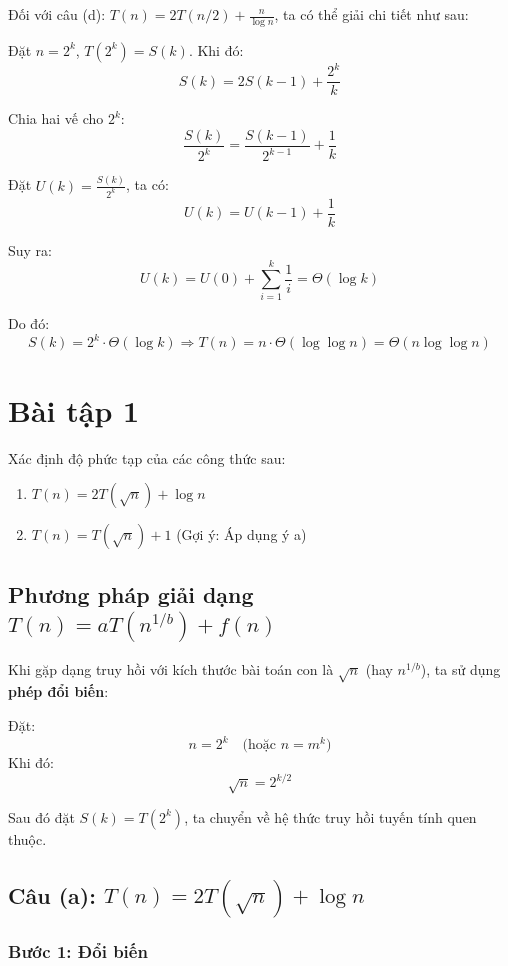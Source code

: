 \documentclass{article}
\begin{document}
Đối với câu (d): \(T(n) = 2T(n/2) + \frac{n}{\log n}\), ta có thể giải chi tiết như sau:

Đặt \(n = 2^k\), \(T(2^k) = S(k)\). Khi đó:
\[
S(k) = 2S(k-1) + \frac{2^k}{k}
\]

Chia hai vế cho \(2^k\):
\[
\frac{S(k)}{2^k} = \frac{S(k-1)}{2^{k-1}} + \frac{1}{k}
\]

Đặt \(U(k) = \frac{S(k)}{2^k}\), ta có:
\[
U(k) = U(k-1) + \frac{1}{k}
\]

Suy ra:
\[
U(k) = U(0) + \sum_{i=1}^k \frac{1}{i} = \Theta(\log k)
\]

Do đó:
\[
S(k) = 2^k \cdot \Theta(\log k) \Rightarrow T(n) = n \cdot \Theta(\log \log n) = \Theta(n \log \log n)
\]


\section{Bài tập 1}

Xác định độ phức tạp của các công thức sau:

\begin{enumerate}
    \item[(a)] \( T(n) = 2T(\sqrt{n}) + \log n \)
    \item[(b)] \( T(n) = T(\sqrt{n}) + 1 \) \hfill (Gợi ý: Áp dụng ý a)
\end{enumerate}

\subsection{Phương pháp giải dạng \(T(n) = aT(n^{1/b}) + f(n)\)}

Khi gặp dạng truy hồi với kích thước bài toán con là \(\sqrt{n}\) (hay \(n^{1/b}\)), ta sử dụng \textbf{phép đổi biến}:

Đặt:
\[
n = 2^k \quad \text{(hoặc } n = m^k \text{)}
\]
Khi đó:
\[
\sqrt{n} = 2^{k/2}
\]

Sau đó đặt \(S(k) = T(2^k)\), ta chuyển về hệ thức truy hồi tuyến tính quen thuộc.

\subsection{Câu (a): \( T(n) = 2T(\sqrt{n}) + \log n \)}

\subsubsection{Bước 1: Đổi biến}
\end{document}
